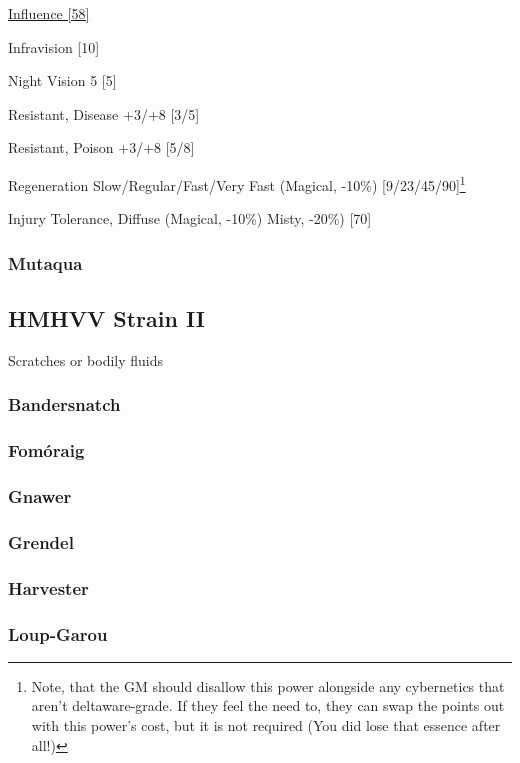 \begin{multicols*}{3}
	\hyperref[influence]{Influence [58]}
	
	Infravision [10]
	
	Night Vision 5 [5]
	
	Resistant, Disease +3/+8 [3/5]
	
	Resistant, Poison +3/+8 [5/8]
	
	Regeneration Slow/Regular/Fast/Very Fast (Magical, -10\%) [9/23/45/90]\footnote{Note, that the GM should disallow this power alongside any cybernetics that aren't deltaware-grade. If they feel the need to, they can swap the points out with this power's cost, but it is not required (You did lose that essence after all!)}
	
	Injury Tolerance, Diffuse (Magical, -10\%) Misty, -20\%) [70]
	
	\subsubsection{Mutaqua}
	
	
	\subsection*{HMHVV Strain II}
	
	Scratches or bodily fluids
	
	\subsubsection{Bandersnatch}
	
	\subsubsection{Fomóraig}
	
	\subsubsection{Gnawer}
	
	\subsubsection{Grendel}
	
	\subsubsection{Harvester}
	
	\subsubsection{Loup-Garou}
	

\end{multicols*}
